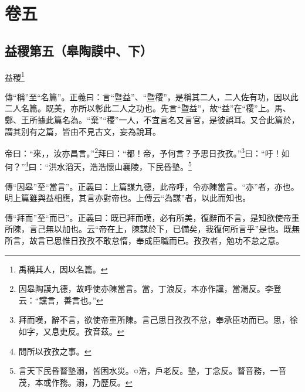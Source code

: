 

\chapter{卷五}


\section{益稷第五（皋陶謨中、下）}


益稷\footnote{禹稱其人，因以名篇。}

{\noindent\zhuan{}\fzbyks 傳“稱”至“名篇”。正義曰：言“暨益”、“暨稷”，是稱其二人，二人佐有功，因以此二人名篇。既美，亦所以彰此二人之功也。先言“暨益”，故“益”在“稷”上。馬、鄭、王所據此篇名為。“棄”“稷”一人，不宜言名又言官，是彼誤耳。又合此篇於，謂其別有之篇，皆由不見古文，妄為說耳。 \par}

帝曰：“來，，汝亦昌言。”\footnote{因皋陶謨九德，故呼使亦陳當言。當，丁浪反，本亦作讜，當湯反。李登云：“讜言，善言也。”}拜曰：“都！帝，予何言？予思日孜孜。”\footnote{拜而嘆，辭不言，欲使帝重所陳。言己思日孜孜不怠，奉承臣功而已。思，徐如字，又息吏反。孜音茲。}曰：“吁！如何？”\footnote{問所以孜孜之事。}曰：“洪水滔天，浩浩懷山襄陵，下民昏墊。\footnote{言天下民昏瞀墊溺，皆困水災。○浩，戶老反。墊，丁念反。瞀音務，一音茂，本或作務。溺，乃歷反。}


{\noindent\zhuan{}\fzbyks 傳“因皋”至“當言”。正義曰：上篇謀九德，此帝呼，令亦陳當言。“亦”者，亦也。明上篇雖與益相應，其言亦對帝也。上傳云“為謀”者，以此而知也。 \par}

{\noindent\zhuan{}\fzbyks 傳“拜而”至“而已”。正義曰：既已拜而嘆，必有所美，復辭而不言，是知欲使帝重所陳，言己無以加也。云“帝在上，陳謀於下，已備矣，我復何所言乎”是也。既無所言，故言已思惟日孜孜不敢怠惰，奉成臣職而已。孜孜者，勉功不怠之意。 \par}

